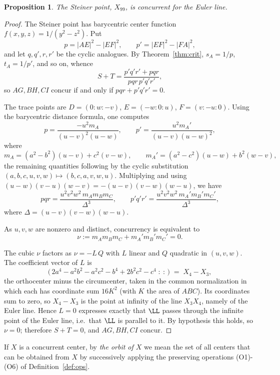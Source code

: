 \documentclass[12pt,a4paper]{amsart}
\newtheorem{proposition}[theorem]{Proposition}
\theoremstyle{remark}
\begin{document}
\goodbreak
\begin{proposition}\label{prop:steiner-euler}
The Steiner point, $X_{99}$, is concurrent for the Euler line.
\end{proposition}

\begin{proof}
The Steiner point has barycentric center function $f(x,y,z)=1/(y^{2}-z^{2})$.
Put
\[
  p=|AE|^{2}-|EF|^{2},\qquad p'=|EF|^{2}-|FA|^{2},
\]
and let $q,q',r,r'$ be the cyclic analogues. By
Theorem~\ref{thm:crit}, $s_A=1/p$, $t_A=1/p'$, and so on, whence
\[
  S+T=\frac{p'q'r'+pqr}{pqr\,p'q'r'},
\]
so $AG,BH,CI$ concur if and only if
$pqr+p'q'r'=0$.

The trace points are $D=(0:w:-v)$, $E=(-w:0:u)$, $F=(v:-u:0)$. Using the
barycentric distance formula, one computes
\[
  p=\frac{-u^{2}m_A}{(u-v)^{2}(u-w)},\qquad
  p'=\frac{u^{2}m_A'}{(u-v)(u-w)^{2}},
\]
where
\[
  m_A=(a^{2}-b^{2})(u-v)+c^{2}(v-w),\qquad
  m_A'=(a^{2}-c^{2})(u-w)+b^{2}(w-v),
\]
the remaining quantities following by the cyclic substitution
$(a,b,c,u,v,w)\mapsto(b,c,a,v,w,u)$. Multiplying and using
$(u-w)(v-u)(w-v)=-(u-v)(v-w)(w-u)$,
we have
\[
  pqr=\frac{u^{2}v^{2}w^{2}\,m_Am_Bm_C}{\Delta^{3}},\qquad
  p'q'r'=\frac{u^{2}v^{2}w^{2}\,m_A'm_B'm_C'}{\Delta^{3}},
\]
where $\Delta=(u-v)(v-w)(w-u)$.

As $u,v,w$ are nonzero and distinct, concurrency is equivalent to
\[
  \nu:=m_Am_Bm_C+m_A'm_B'm_C'=0.
\]

The cubic $\nu$ factors as $\nu=-L\,Q$ with $L$ linear and $Q$ quadratic in
$(u,v,w)$. The coefficient vector of $L$ is
\[
  \bigl(\,2a^{4}-a^{2}b^{2}-a^{2}c^{2}-b^{4}+2b^{2}c^{2}-c^{4}\;:\ :\,\bigr)
  \;=\;X_4-X_3,
\]
the orthocenter minus the circumcenter, taken in the common normalization in
which each has coordinate sum $16K^{2}$ (with $K$ the area of $ABC$). Its
coordinates sum to zero, so $X_4-X_3$ is the point at infinity of the line
$X_3X_4$, namely of the Euler line. Hence $L=0$ expresses exactly that
$\LL$ passes through the infinite point of the Euler line, i.e.\ that $\LL$
is parallel to it. By hypothesis this holds, so $\nu=0$; therefore $S+T=0$,
and $AG,BH,CI$ concur.
\end{proof}

If $X$ is a concurrent center, by \emph{the orbit of $X$} we mean the set of all
centers that can be obtained from $X$ by successively applying the preserving operations (O1)-(O6)
of Definition~\ref{def:ops}.
\end{document}
